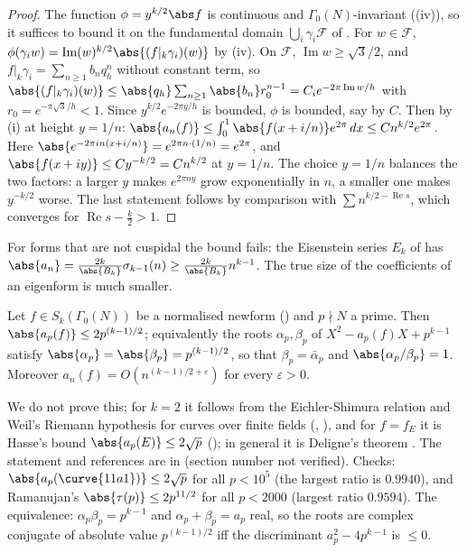 \begin{proof}
The function $\phi=y^{k/2}\abs f$ is continuous and $\Gamma_0(N)$-invariant ((iv)), so it suffices to bound it on the fundamental domain
$\bigcup_i\gamma_i\mathcal F$ of . For $w\in\mathcal F$, $\phi(\gamma_iw)=\operatorname{Im}(w)^{k/2}\abs{(f|_k\gamma_i)(w)}$ by (iv). On $\mathcal F$,
$\operatorname{Im}w\ge\sqrt3/2$, and $f|_k\gamma_i=\sum_{n\ge1}b_nq_h^n$ without constant term, so $\abs{(f|_k\gamma_i)(w)}\le\abs{q_h}\sum_{n\ge1}\abs{b_n}r_0^{n-1}=C_ie^{-2\pi\operatorname{Im}w/h}$ with
$r_0=e^{-\pi\sqrt3/h}<1$. Since $y^{k/2}e^{-2\pi y/h}$ is bounded, $\phi$ is bounded, say by $C$. Then by (i) at height $y=1/n$:
$\abs{a_n(f)}\le\int_0^1\abs{f(x+i/n)}e^{2\pi}\,dx\le Cn^{k/2}e^{2\pi}$. Here $\abs{e^{-2\pi in(x+i/n)}}=e^{2\pi n\cdot(1/n)}=e^{2\pi}$, and $\abs{f(x+iy)}\le Cy^{-k/2}=Cn^{k/2}$ at
$y=1/n$. The choice $y=1/n$ balances the two factors: a larger $y$ makes $e^{2\pi ny}$ grow exponentially in $n$, a smaller one makes $y^{-k/2}$ worse. The last statement
follows by comparison with $\sum n^{k/2-\operatorname{Re}s}$, which converges for $\operatorname{Re}s-\frac k2>1$.
\end{proof}

For forms that are not cuspidal the bound fails: the Eisenstein series $E_k$ of  has $\abs{a_n}=\frac{2k}{\abs{B_k}}\sigma_{k-1}(n)\ge\frac{2k}{\abs{B_k}}n^{k-1}$.
The true size of the coefficients of an eigenform is much smaller.

\begin{theorem}\label{thm:modforms:ramanujan-petersson}
Let $f\in S_k(\Gamma_0(N))$ be a normalised newform () and $p\nmid N$ a prime. Then $\abs{a_p(f)}\le2p^{(k-1)/2}$; equivalently the roots $\alpha_p,\beta_p$ of
$X^2-a_p(f)X+p^{k-1}$ satisfy $\abs{\alpha_p}=\abs{\beta_p}=p^{(k-1)/2}$, so that $\beta_p=\bar\alpha_p$ and $\abs{\alpha_p/\beta_p}=1$. Moreover $a_n(f)=O(n^{(k-1)/2+\varepsilon})$ for every $\varepsilon>0$.
\end{theorem}

We do not prove this; for $k=2$ it follows from the Eichler-Shimura relation and Weil's Riemann hypothesis for curves over finite fields (,
), and for $f=f_E$ it is Hasse's bound $\abs{a_p(E)}\le2\sqrt p$ (); in general it is Deligne's theorem \cite{Deligne}. The statement and
references are in \cite[Section 8.7]{DiamondShurman} (section number not verified). Checks: $\abs{a_p(\curve{11a1})}\le2\sqrt p$ for all $p<10^5$ (the largest ratio is
$0.9940$), and Ramanujan's $\abs{\tau(p)}\le2p^{11/2}$ for all $p<2000$ (largest ratio $0.9594$). The equivalence: $\alpha_p\beta_p=p^{k-1}$ and $\alpha_p+\beta_p=a_p$ real, so the roots
are complex conjugate of absolute value $p^{(k-1)/2}$ iff the discriminant $a_p^2-4p^{k-1}$ is $\le0$.

